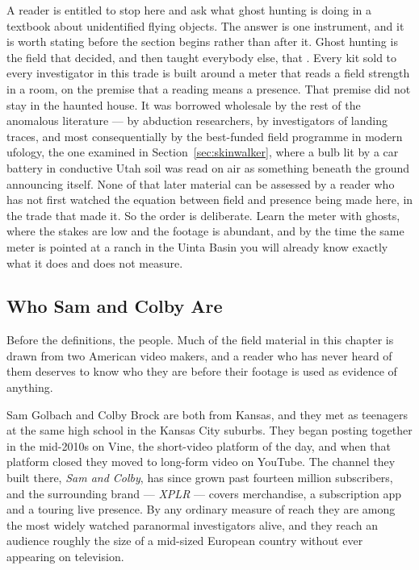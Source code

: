 A reader is entitled to stop here and ask what ghost hunting is doing in a textbook about
unidentified flying objects. The answer is one instrument, and it is worth stating before the
section begins rather than after it. Ghost hunting is the field that decided, and then taught
everybody else, that . Every kit sold to
every investigator in this trade is built around a meter that reads a field strength in a room, on
the premise that a reading means a presence. That premise did not stay in the haunted house. It
was borrowed wholesale by the rest of the anomalous literature --- by abduction researchers, by
investigators of landing traces, and most consequentially by the best-funded field programme in
modern ufology, the one examined in Section~\ref{sec:skinwalker}, where a bulb lit by a car
battery in conductive Utah soil was read on air as something beneath the ground announcing itself.
None of that later material can be assessed by a reader who has not first watched the equation
between field and presence being made here, in the trade that made it. So the order is deliberate.
Learn the meter with ghosts, where the stakes are low and the footage is abundant, and by the time
the same meter is pointed at a ranch in the Uinta Basin you will already know exactly what it does
and does not measure.

\subsection{Who Sam and Colby Are}\label{sec:whosamcolby}
Before the definitions, the people. Much of the field material in this chapter is drawn from
two American video makers, and a reader who has never heard of them deserves to know who
they are before their footage is used as evidence of anything.

Sam Golbach and Colby Brock are both from Kansas, and they met as teenagers at the same high
school in the Kansas City suburbs. They began posting together in the mid-2010s on Vine, the
short-video platform of the day, and when that platform closed they moved to long-form video
on YouTube. The channel they built there, \emph{Sam and Colby}, has since grown past fourteen
million subscribers, and the surrounding brand --- \emph{XPLR} --- covers merchandise, a
subscription app and a touring live presence. By any ordinary measure of reach they are among
the most widely watched paranormal investigators alive, and they reach an audience roughly the
size of a mid-sized European country without ever appearing on television.

